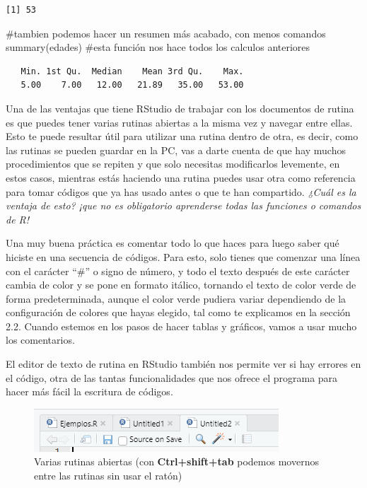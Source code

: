 \documentclass[
  letterpaper,
  DIV=11,
  numbers=noendperiod]{scrreprt}
\newenvironment{Shaded}{\begin{snugshade}}{\end{snugshade}}
\newcommand{\CommentTok}[1]{\textcolor[rgb]{0.37,0.37,0.37}{#1}}
\newcommand{\FunctionTok}[1]{\textcolor[rgb]{0.28,0.35,0.67}{#1}}
\newcommand{\NormalTok}[1]{\textcolor[rgb]{0.00,0.23,0.31}{#1}}
\begin{document}
\begin{verbatim}
[1] 53
\end{verbatim}

\begin{Shaded}
\begin{Highlighting}[]
\CommentTok{\#tambien podemos hacer un resumen más acabado, con menos comandos}
\FunctionTok{summary}\NormalTok{(edades) }\CommentTok{\#esta función nos hace todos los calculos anteriores}
\end{Highlighting}
\end{Shaded}

\begin{verbatim}
   Min. 1st Qu.  Median    Mean 3rd Qu.    Max. 
   5.00    7.00   12.00   21.89   35.00   53.00 
\end{verbatim}

Una de las ventajas que tiene RStudio de trabajar con los documentos de
rutina es que puedes tener varias rutinas abiertas a la misma vez y
navegar entre ellas. Esto te puede resultar útil para utilizar una
rutina dentro de otra, es decir, como las rutinas se pueden guardar en
la PC, vas a darte cuenta de que hay muchos procedimientos que se
repiten y que solo necesitas modificarlos levemente, en estos casos,
mientras estás haciendo una rutina puedes usar otra como referencia para
tomar códigos que ya has usado antes o que te han compartido.
\emph{¿Cuál es la ventaja de esto? ¡que no es obligatorio aprenderse
todas las funciones o comandos de R!}

Una muy buena práctica es comentar todo lo que haces para luego saber
qué hiciste en una secuencia de códigos. Para esto, solo tienes que
comenzar una línea con el carácter ``\#'' o signo de número, y todo el
texto después de este carácter cambia de color y se pone en formato
itálico, tornando el texto de color verde de forma predeterminada,
aunque el color verde pudiera variar dependiendo de la configuración de
colores que hayas elegido, tal como te explicamos en la sección 2.2.
Cuando estemos en los pasos de hacer tablas y gráficos, vamos a usar
mucho los comentarios.

El editor de texto de rutina en RStudio también nos permite ver si hay
errores en el código, otra de las tantas funcionalidades que nos ofrece
el programa para hacer más fácil la escritura de códigos.

\begin{figure}[H]

{\centering \includegraphics[width=0.5\linewidth,height=\textheight,keepaspectratio]{imagenes/01rutinas2.png}

}

\caption{Varias rutinas abiertas (con \textbf{Ctrl+shift+tab} podemos
movernos entre las rutinas sin usar el ratón)}

\end{figure}%
\end{document}
